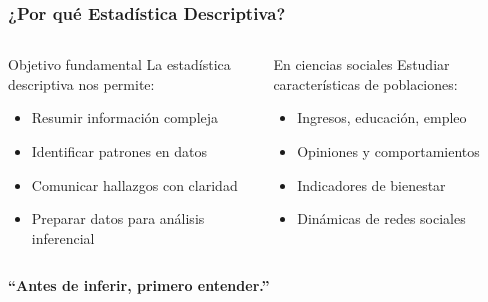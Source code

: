 \documentclass[aspectratio=169,11pt]{beamer}
\begin{document}
\begin{frame}[fragile]
\frametitle{¿Por qué Estadística Descriptiva?}

\begin{columns}[T]
  \begin{block}{Objetivo fundamental}
    La estadística descriptiva nos permite:
    \begin{itemize}
      \item Resumir información compleja
      \item Identificar patrones en datos
      \item Comunicar hallazgos con claridad
      \item Preparar datos para análisis inferencial
    \end{itemize}
  \end{block}

  \begin{exampleblock}{En ciencias sociales}
    Estudiar características de poblaciones:
    \begin{itemize}
      \item Ingresos, educación, empleo
      \item Opiniones y comportamientos
      \item Indicadores de bienestar
      \item Dinámicas de redes sociales
    \end{itemize}
  \end{exampleblock}
\end{columns}

\pause
\vspace{0.5cm}
\centering
\textbf{``Antes de inferir, primero entender.''}
\end{frame}
\end{document}
